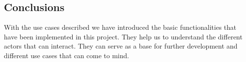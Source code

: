 \FloatBarrier

\subsection{Conclusions}

With the use cases described we have introduced the basic functionalities that have been implemented in this project. They help us to understand the different actors that can interact. They can serve as a base for further development and different use cases that can come to mind.